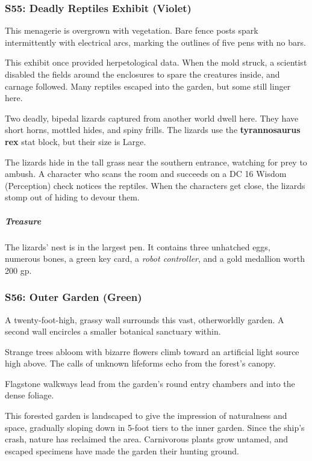 \documentclass[10pt,a4paper,twoside,bg=print,twocolumn,openany,nodeprecatedcode]{dndbook}
\begin{document}
\subsubsection{S55: Deadly Reptiles Exhibit (Violet)}
\begin{DndReadAloud}{}
This menagerie is overgrown with vegetation. Bare fence posts spark intermittently with electrical arcs, marking the outlines of five pens with no bars.

\end{DndReadAloud}

This exhibit once provided herpetological data. When the mold struck, a scientist disabled the fields around the enclosures to spare the creatures inside, and carnage followed. Many reptiles escaped into the garden, but some still linger here.

Two deadly, bipedal lizards captured from another world dwell here. They have short horns, mottled hides, and spiny frills. The lizards use the \textbf{tyrannosaurus rex} stat block, but their size is Large.

The lizards hide in the tall grass near the southern entrance, watching for prey to ambush. A character who scans the room and succeeds on a DC 16 Wisdom (Perception) check notices the reptiles. When the characters get close, the lizards stomp out of hiding to devour them.

\subparagraph{Treasure}
The lizards' nest is in the largest pen. It contains three unhatched eggs, numerous bones, a green key card, a \textit{robot controller}, and a gold medallion worth 200 gp.

\subsubsection{S56: Outer Garden (Green)}
\begin{DndReadAloud}{}
A twenty-foot-high, grassy wall surrounds this vast, otherworldly garden. A second wall encircles a smaller botanical sanctuary within.

Strange trees abloom with bizarre flowers climb toward an artificial light source high above. The calls of unknown lifeforms echo from the forest's canopy.

Flagstone walkways lead from the garden's round entry chambers and into the dense foliage.

\end{DndReadAloud}

This forested garden is landscaped to give the impression of naturalness and space, gradually sloping down in 5-foot tiers to the inner garden. Since the ship's crash, nature has reclaimed the area. Carnivorous plants grow untamed, and escaped specimens have made the garden their hunting ground.
\end{document}
